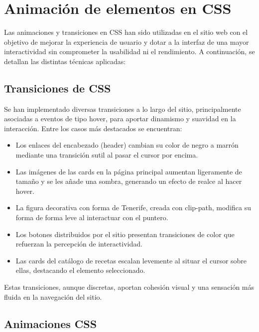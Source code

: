 \documentclass{article}
\begin{document}
\section{Animación de elementos en CSS}\label{sec:animacion-de-elementos-en-css}

Las animaciones y transiciones en CSS han sido utilizadas en el sitio web con el objetivo de mejorar la experiencia de usuario y dotar a la interfaz de una mayor interactividad sin comprometer la usabilidad ni el rendimiento. A continuación, se detallan las distintas técnicas aplicadas:

\subsection{Transiciones de CSS}\label{subsec:transiciones-de-css}

Se han implementado diversas transiciones a lo largo del sitio, principalmente asociadas a eventos de tipo hover, para aportar dinamismo y suavidad en la interacción. Entre los casos más destacados se encuentran:

\begin{itemize}
    \item Los enlaces del encabezado (header) cambian su color de negro a marrón mediante una transición sutil al pasar el cursor por encima.
    \item Las imágenes de las cards en la página principal aumentan ligeramente de tamaño y se les añade una sombra, generando un efecto de realce al hacer hover.
    \item La figura decorativa con forma de Tenerife, creada con clip-path, modifica su forma de forma leve al interactuar con el puntero.
    \item Los botones distribuidos por el sitio presentan transiciones de color que refuerzan la percepción de interactividad.
    \item Las cards del catálogo de recetas escalan levemente al situar el cursor sobre ellas, destacando el elemento seleccionado.
\end{itemize}

Estas transiciones, aunque discretas, aportan cohesión visual y una sensación más fluida en la navegación del sitio.

\subsection{Animaciones CSS}\label{subsec:animaciones-css}
\end{document}
